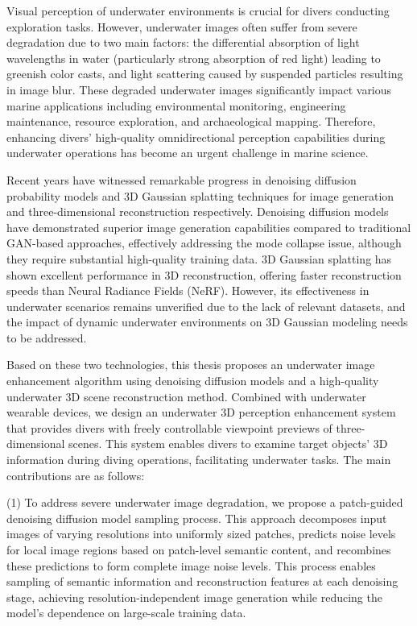 \begin{abstract*}
Visual perception of underwater environments is crucial for divers conducting exploration tasks. 
However, underwater images often suffer from severe degradation due to two main factors: 
the differential absorption of light wavelengths in water (particularly strong absorption of red light) leading to greenish color casts, 
and light scattering caused by suspended particles resulting in image blur. 
These degraded underwater images significantly impact various marine applications including environmental monitoring, engineering maintenance, resource exploration, and archaeological mapping. 
Therefore, enhancing divers' high-quality omnidirectional perception capabilities during underwater operations has become an urgent challenge in marine science.

Recent years have witnessed remarkable progress in denoising diffusion probability models and 3D Gaussian splatting techniques for image generation and three-dimensional reconstruction respectively. 
Denoising diffusion models have demonstrated superior image generation capabilities compared to traditional GAN-based approaches, effectively addressing the mode collapse issue, although they require substantial high-quality training data. 
3D Gaussian splatting has shown excellent performance in 3D reconstruction, offering faster reconstruction speeds than Neural Radiance Fields (NeRF). However, its effectiveness in underwater scenarios remains unverified due to the lack of relevant datasets, and the impact of dynamic underwater environments on 3D Gaussian modeling needs to be addressed.

Based on these two technologies, this thesis proposes an underwater image enhancement algorithm using denoising diffusion models and a high-quality underwater 3D scene reconstruction method. 
Combined with underwater wearable devices, we design an underwater 3D perception enhancement system that provides divers with freely controllable viewpoint previews of three-dimensional scenes. 
This system enables divers to examine target objects' 3D information during diving operations, facilitating underwater tasks. The main contributions are as follows:

(1) To address severe underwater image degradation, we propose a patch-guided denoising diffusion model sampling process. 
This approach decomposes input images of varying resolutions into uniformly sized patches, predicts noise levels for local image regions based on patch-level semantic content, 
and recombines these predictions to form complete image noise levels. This process enables sampling of semantic information and reconstruction features at each denoising stage, 
achieving resolution-independent image generation while reducing the model's dependence on large-scale training data.


\end{abstract*}
